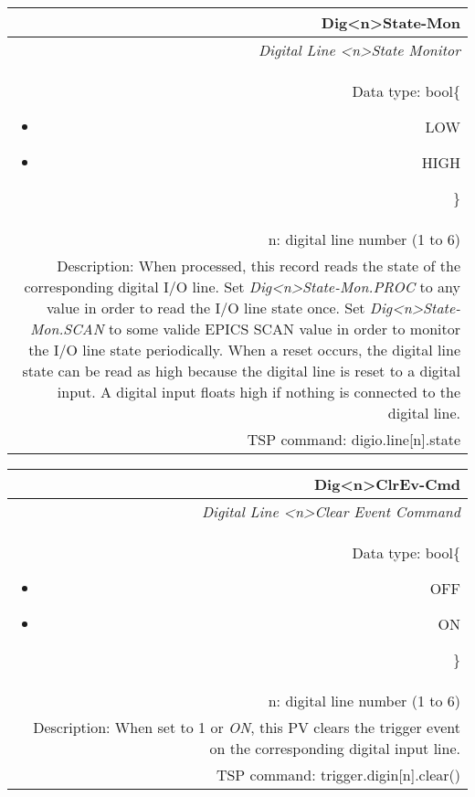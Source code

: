 \documentclass[openany]{article}
\begin{document}
		\begin{tabular}{N}
			\hline
			\bfseries Dig{\textless n\textgreater}State-Mon\label{pv:digstate-mon} \\ \hline
			\emph{Digital Line \textless n\textgreater State Monitor} \\
			Data type: bool\{\begin{itemize}[noitemsep]
				\small
				\item[] LOW
				\item[] HIGH
			\end{itemize}\} \\
			n: digital line number (1 to 6) \\
			Description: When processed, this record reads the state of the corresponding digital I/O line. Set \emph{Dig{\textless n\textgreater}State-Mon.PROC} to any value in order to read the I/O line state once. Set \emph{Dig{\textless n\textgreater}State-Mon.SCAN} to some valide EPICS SCAN value in order to monitor the I/O line state periodically. When a reset occurs, the digital line state can be read as high because the digital line is reset to a digital input. A digital input floats high if nothing is connected to the digital line. \\
			TSP command: digio.line[n].state
		\end{tabular}

		\begin{tabular}{N}
			\hline
			\bfseries Dig{\textless n\textgreater}ClrEv-Cmd\label{pv:digclrev-cmd} \\ \hline
			\emph{Digital Line \textless n\textgreater Clear Event Command} \\
			Data type: bool\{\begin{itemize}[noitemsep]
				\small
				\item[] OFF
				\item[] ON
			\end{itemize}\} \\
			n: digital line number (1 to 6) \\
			Description: When set to 1 or \emph{ON}, this PV clears the trigger event on the corresponding digital input line. \\
			TSP command: trigger.digin[n].clear()
		\end{tabular}
\end{document}
